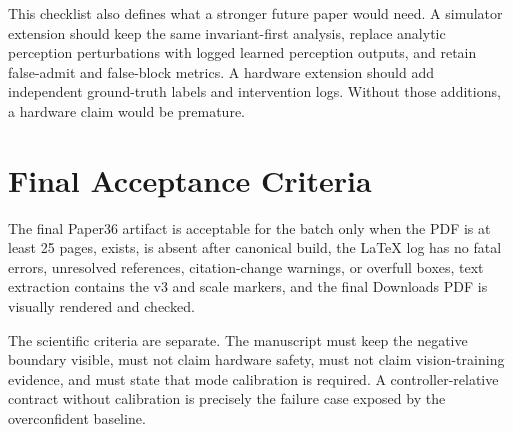 \documentclass{article}
\begin{document}
This checklist also defines what a stronger future paper would need. A simulator extension should keep the same invariant-first analysis, replace analytic perception perturbations with logged learned perception outputs, and retain false-admit and false-block metrics. A hardware extension should add independent ground-truth labels and intervention logs. Without those additions, a hardware claim would be premature.

\section{Final Acceptance Criteria}

The final Paper36 artifact is acceptable for the batch only when the PDF is at least 25 pages,  exists,  is absent after canonical build, the LaTeX log has no fatal errors, unresolved references, citation-change warnings, or overfull boxes, text extraction contains the v3 and scale markers, and the final Downloads PDF is visually rendered and checked.

The scientific criteria are separate. The manuscript must keep the negative boundary visible, must not claim hardware safety, must not claim vision-training evidence, and must state that mode calibration is required. A controller-relative contract without calibration is precisely the failure case exposed by the overconfident baseline.



\end{document}
